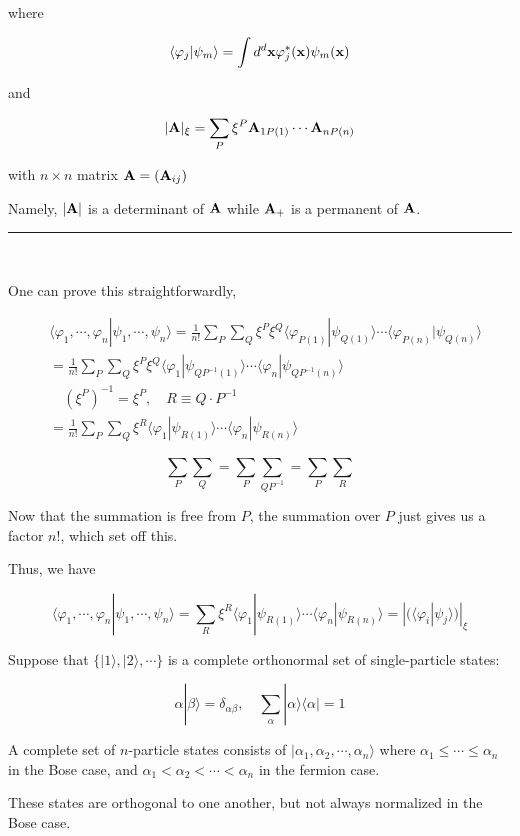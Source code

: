 ﻿\documentclass[twoside]{book}
\numberwithin{equation}{section}
\begin{document}
where 

\[\langle\varphi_j|\psi_m\rangle = \int d^d {\bf x}\varphi_j^*({\bf x})\psi_m({\bf x}) \]

and

\[|{\bf A}|_{\xi} = \sum_{P}\xi^P {\bf A}_{1P(1)}\cdots{\bf A}_{nP(n)} \]

with $n\times n$ matrix ${\bf A} = ({\bf A}_{ij})$

Namely, $|{\bf A}|$ is a determinant of ${\bf A}$ while ${\bf A}_+$ is a permanent of ${\bf A}$. 

\hrule

\ 

One can prove this straightforwardly, %

\[\begin{split}
&\langle\varphi_1,\cdots,\varphi_n|\psi_1,\cdots,\psi_n\rangle =\frac{1}{n!}\sum_P\sum_Q\xi^P\xi^Q\langle\varphi_{P(1)}|\psi_{Q(1)}\rangle\cdots\langle\varphi_{P(n)}|\psi_{Q(n)}\rangle \\
& = \frac{1}{n!}\sum_{P}\sum_{Q}\xi^P\xi^Q\langle\varphi_1|\psi_{QP^{-1}(1)}\rangle\cdots\langle\varphi_n|\psi_{QP^{-1}(n)}\rangle\\
&\quad (\xi^P)^{-1} = \xi^P,\quad R\equiv Q\cdot P^{-1}\\
&= \frac{1}{n!} \sum_P\sum_Q\xi^R\langle\varphi_1|\psi_{R(1)}\rangle\cdots\langle\varphi_n|\psi_{R(n)}\rangle
\end{split}\]

\[\sum_P\sum_Q = \sum_P\sum_{QP^{-1}}=\sum_P\sum_R \]

Now that the summation is free from $P$, the summation over $P$ just gives us a factor $n!$, which set off this. 

Thus, we have

\[\langle\varphi_1,\cdots,\varphi_n|\psi_1,\cdots,\psi_n\rangle = \sum_R\xi^R\langle\varphi_1|\psi_{R(1)}\rangle\cdots\langle\varphi_n|\psi_{R(n)}\rangle = |(\langle\varphi_i|\psi_j\rangle)|_\xi \]

Suppose that $\{|1\rangle,|2\rangle,\cdots\}$ is a complete orthonormal set of single-particle states:

\[\alpha|\beta\rangle = \delta_{\alpha\beta},\quad\sum_{\alpha}|\alpha\rangle\langle\alpha| = 1 \]

A complete set of $n$-particle states consists of $|\alpha_1,\alpha_2,\cdots,\alpha_n\rangle$ where $\alpha_1\le\cdots\le\alpha_n$ in the Bose case, and $\alpha_1<\alpha_2<\cdots<\alpha_n$ in the fermion case. 

These states are orthogonal to one another, but not always normalized in the Bose case. 
\end{document}
